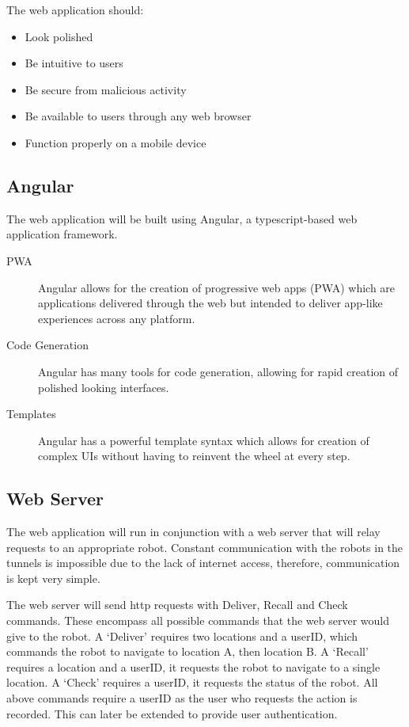 \documentclass[12pt]{report}
\begin{document}
The web application should:
\begin{itemize}
\itemsep0em 
\item Look polished
\item Be intuitive to users
\item Be secure from malicious activity
\item Be available to users through any web browser
\item Function properly on a mobile device
\end{itemize}
\subsection{Angular}
The web application will be built using Angular, a typescript-based web application framework. 
\begin{description}
   \item[PWA] Angular allows for the creation of progressive web apps (PWA) which are applications delivered through the web but intended to deliver app-like experiences across any platform.
   \item[Code Generation] Angular has many tools for code generation, allowing for rapid creation of polished looking interfaces.
   \item[Templates] Angular has a powerful template syntax which allows for creation of complex UIs without having to reinvent the wheel at every step.
\end{description}
\subsection{Web Server}
The web application will run in conjunction with a web server that will relay requests to an appropriate robot. Constant communication with the robots in the tunnels is impossible due to the lack of internet access, therefore, communication is kept very simple.

The web server will send http requests with Deliver, Recall and Check commands. These encompass all possible commands that the web server would give to the robot. A `Deliver' requires two locations and a userID, which commands the robot to navigate to location A, then location B. A `Recall' requires a location and a userID, it requests the robot to navigate to a single location. A `Check' requires a userID, it requests the status of the robot. All above commands require a userID as the user who requests the action is recorded. This can later be extended to provide user authentication.
\end{document}
